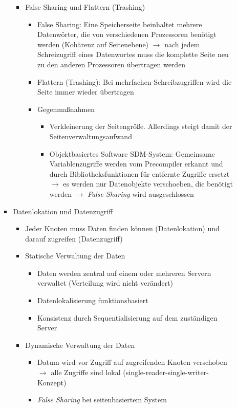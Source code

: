 \begin{itemize}
\begin{itemize}
\begin{itemize}
\begin{itemize}
				\item False Sharing und Flattern (Trashing)
				\begin{itemize}
					\item False Sharing: Eine Speicherseite beinhaltet mehrere Datenwörter, die von verschiedenen Prozessoren benötigt werden (Kohärenz auf Seitenebene) \(\rightarrow\) nach jedem Schreizugriff eines Datenwortes muss die komplette Seite neu zu den anderen Prozessoren übertragen werden
					\item Flattern (Trashing): Bei mehrfachen Schreibzugriffen wird die Seite immer wieder übertragen
					\item Gegenmaßnahmen
					\begin{itemize}
						\item Verkleinerung der Seitengröße. Allerdings steigt damit der Seitenverwaltungsaufwand
						\item Objektbasiertes Software SDM-System: Gemeinsame Variablenzugriffe werden vom Precompiler erkannt und durch Bibliotheksfunktionen für entfernte Zugriffe ersetzt \(\rightarrow\) es werden nur Datenobjekte verschoeben, die benötigt werden \(\rightarrow\) \textit{False Sharing} wird ausgeschlossen
					\end{itemize}
				\end{itemize}
			\end{itemize}
			\item Datenlokation und Datenzugriff
			\begin{itemize}
				\item Jeder Knoten muss Daten finden können (Datenlokation) und darauf zugreifen (Datenzugriff)
				\item Statische Verwaltung der Daten
				\begin{itemize}
					\item Daten werden zentral auf einem oder mehreren Servern verwaltet (Verteilung wird nicht verändert)
					\item Datenlokalisierung funktionsbasiert
					\item Konsistenz durch Sequentialisierung auf dem zuständigen Server
				\end{itemize}
				\item Dynamische Verwaltung der Daten
				\begin{itemize}
					\item Datum wird vor Zugriff auf zugreifenden Knoten verschoben \(\rightarrow\) alle Zugriffe sind lokal (single-reader-single-writer-Konzept)
					\item \textit{False Sharing} bei seitenbasiertem System

\end{itemize}
\end{itemize}
\end{itemize}
\end{itemize}
\end{itemize}
